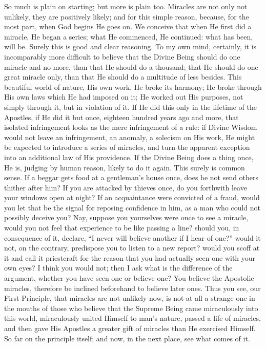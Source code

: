 So much is plain on starting; but more is plain too.
Miracles are not only not unlikely, they are positively
likely; and for this simple reason, because, for the most
part, when God begins He goes on. We conceive that when
He first did a miracle, He began a series; what He
commenced, He continued: what has been, will be. Surely
this is good and clear reasoning. To my own mind,
certainly, it is incomparably more difficult to believe
that the Divine Being should do one miracle and no more,
than that He should do a thousand; that He should do one
great miracle only, than that He should do a multitude of
less besides. This beautiful world of nature, His own
work, He broke its harmony; He broke through His own laws
which He had imposed on it; He worked out His purposes,
not simply through it, but in violation of it. If He did
this only in the lifetime of the Apostles, if He did it
but once, eighteen hundred years ago and more, that
isolated infringement looks as the mere infringement of a
rule: if Divine Wisdom would not leave an infringement,
an anomaly, a solecism on His work, He might be expected
to introduce a series of miracles, and turn the apparent
exception into an additional law of His providence. If
the Divine Being does a thing once, He is, judging by
human reason, likely to do it again. This surely is
common sense. If a beggar gets food at a gentleman's
house once, does he not send others thither after him? If
you are attacked by thieves once, do you forthwith leave
your windows open at night? If an acquaintance were
convicted of a fraud, would you let that be the signal
for reposing confidence in him, as a man who could not
possibly deceive you? Nay, suppose you yourselves were
once to see a miracle, would you not feel that experience
to be like passing a line? should you, in consequence of
it, declare, ``I never will believe another if I hear
of one?'' would it not, on the contrary, predispose
you to listen to a new report? would you scoff at it and
call it priestcraft for the reason that you had actually
seen one with your own eyes? I think you would not; then
I ask what is the difference of the argument, whether you
have seen one or believe one? You believe the Apostolic
miracles, therefore be inclined beforehand to believe
later ones. Thus you see, our First Principle, that
miracles are not unlikely now, is not at all a strange
one in the mouths of those who believe that the Supreme
Being came miraculously into this world, miraculously
united Himself to man's nature, passed a life of
miracles, and then gave His Apostles a greater gift of
miracles than He exercised Himself. So far on the
principle itself; and now, in the next place, see what
comes of it.

